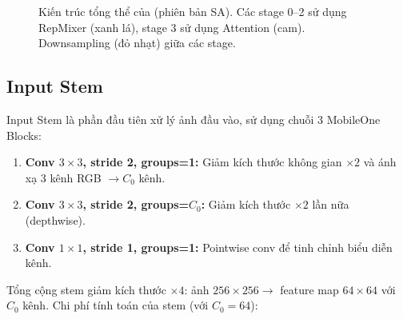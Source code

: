 \begin{figure}[H]
\caption{Kiến trúc tổng thể của \fastvit{} (phiên bản SA). Các stage 0--2 sử dụng RepMixer (xanh lá), stage 3 sử dụng Attention (cam). Downsampling (đỏ nhạt) giữa các stage.}
\label{fig:fastvit_arch}
\end{figure}

\subsection{Input Stem}
\label{subsec:stem}

Input Stem là phần đầu tiên xử lý ảnh đầu vào, sử dụng chuỗi 3 MobileOne Blocks:

\begin{enumerate}
    \item \textbf{Conv $3 \times 3$, stride 2, groups=1:} Giảm kích thước không gian $\times 2$ và ánh xạ 3 kênh RGB $\to C_0$ kênh.
    \item \textbf{Conv $3 \times 3$, stride 2, groups=$C_0$:} Giảm kích thước $\times 2$ lần nữa (depthwise).
    \item \textbf{Conv $1 \times 1$, stride 1, groups=1:} Pointwise conv để tinh chỉnh biểu diễn kênh.
\end{enumerate}

Tổng cộng stem giảm kích thước $\times 4$: ảnh $256 \times 256 \to$ feature map $64 \times 64$ với $C_0$ kênh. Chi phí tính toán của stem (với $C_0 = 64$):

